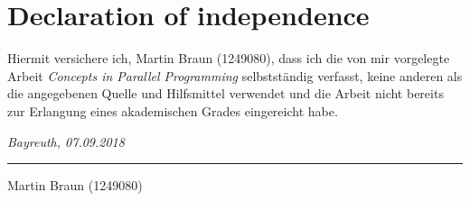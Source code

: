 \documentclass[paper=A4,twoside=true,openright,parskip=full,chapterprefix=true,headings=normal,bibliography=totoc,listof=totoc,titlepage=on,captions=tableabove,draft=false,british]{scrreprt}%
\newcommand{\thesisTitle}{Concepts in Parallel Programming}
\newcommand{\thesisName}{Martin Braun (1249080)}
\newcommand{\thesisDate}{07.09.2018}
\newcommand{\thesisUniversityCity}{Bayreuth}
\begin{document}
\cleardoublepage

%
\chapter*{Declaration of independence}
\label{sec:declaration}
\thispagestyle{empty}

Hiermit versichere ich, {\thesisName}, dass ich die von mir vorgelegte Arbeit
\emph{\thesisTitle} selbstständig verfasst, keine anderen als die angegebenen
Quelle und Hilfsmittel verwendet und die  Arbeit  nicht  bereits  zur  Erlangung  eines
akademischen  Grades  eingereicht habe.

\smallskip

\noindent\textit{\thesisUniversityCity, \thesisDate}

\smallskip

\begin{flushright}
	\begin{minipage}{5cm}
		\rule{\textwidth}{1pt}
		\centering\thesisName
	\end{minipage}
\end{flushright}


\cleardoublepage


\listoffigures
\cleardoublepage

\listoftables
\cleardoublepage

\pagestyle{empty}

\clearpage
\newpage
\mbox{}

\end{document}
